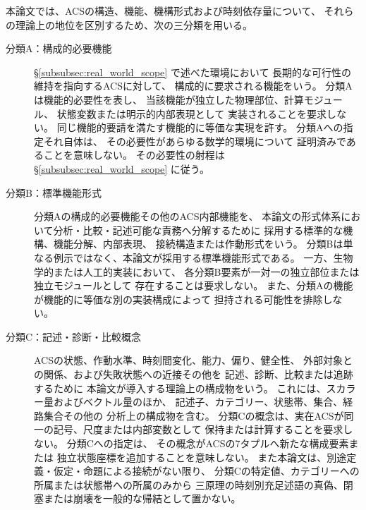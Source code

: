 \begin{definition}[構造・機能概念の三分類]
\label{def:abc_classification}

本論文では、ACSの構造、機能、機構形式および時刻依存量について、
それらの理論上の地位を区別するため、次の三分類を用いる。

\begin{description}

\item[分類A：構成的必要機能]
\S\ref{subsubsec:real_world_scope} で述べた環境において
長期的な可行性の維持を指向するACSに対して、
構成的に要求される機能をいう。
分類Aは機能的必要性を表し、
当該機能が独立した物理部位、計算モジュール、
状態変数または明示的内部表現として
実装されることを要求しない。
同じ機能的要請を満たす機能的に等価な実現を許す。
分類Aへの指定それ自体は、
その必要性があらゆる数学的環境について
証明済みであることを意味しない。
その必要性の射程は \S\ref{subsubsec:real_world_scope} に従う。

\item[分類B：標準機能形式]
分類Aの構成的必要機能その他のACS内部機能を、
本論文の形式体系において分析・比較・記述可能な責務へ分解するために
採用する標準的な機構、機能分解、内部表現、
接続構造または作動形式をいう。
分類Bは単なる例示ではなく、本論文が採用する標準機能形式である。
一方、生物学的または人工的実装において、
各分類B要素が一対一の独立部位または独立モジュールとして
存在することは要求しない。
また、分類Aの機能が機能的に等価な別の実装構成によって
担持される可能性を排除しない。

\item[分類C：記述・診断・比較概念]
ACSの状態、作動水準、時刻間変化、能力、偏り、健全性、
外部対象との関係、および失敗状態への近接その他を
記述、診断、比較または追跡するために
本論文が導入する理論上の構成物をいう。
これには、スカラー量およびベクトル量のほか、
記述子、カテゴリー、状態帯、集合、経路集合その他の
分析上の構成物を含む。
分類Cの概念は、実在ACSが同一の記号、尺度または内部変数として
保持または計算することを要求しない。
分類Cへの指定は、
その概念がACSの7タプルへ新たな構成要素または
独立状態座標を追加することを意味しない。
また本論文は、別途定義・仮定・命題による接続がない限り、
分類Cの特定値、カテゴリーへの所属または状態帯への所属のみから
三原理の時刻別充足述語の真偽、閉塞または崩壊を一般的な帰結として置かない。

\end{description}
\end{definition}

